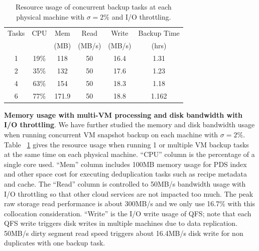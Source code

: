 \begin{table}
\begin{small}
    \begin{tabular}{|c|c|c|c|c|c|}
    \hline
    Tasks & CPU & Mem &Read &  Write  & Backup Time  \\ 
    & & (MB)          &(MB/s) &  (MB/s) & (hrs) \\ \hline
    1     & 19\% & 118 & 50 & 16.4 & 1.31\\ \hline
    2     & 35\% & 132 &50  & 17.6 & 1.23\\ \hline
    4     & 63\% & 154&50   & 18.3 & 1.18\\ \hline
    6     & 77\% & 171.9 & 50 &  18.8 & 1.162\\ \hline
    \end{tabular}
\end{small}
\caption{Resource usage of concurrent backup tasks at each physical machine with $\sigma=2\%$ and I/O throttling.}
\label{tab:resource_usage}
\end{table}

{\bf Memory usage with multi-VM processing and disk bandwidth with  I/O throttling}. 
We have further studied the memory and disk bandwidth usage 
when running concurrent VM snapshot backup on each machine with $\sigma=2\%$. 
Table ~\ref{tab:resource_usage} gives the resource usage  when
running 1 or multiple  VM backup tasks at the same time on each physical machine. 
``CPU'' column is the percentage of a single core used. 
``Mem'' column includes 100MB memory usage for PDS index and other space cost for executing deduplication tasks such as 
recipe metadata and cache. 
The ``Read'' column is controlled to 50MB/s bandwidth usage with I/O throttling so that other cloud services are not impacted too much.
The peak raw storage read performance is about 300MB/s and we only use 16.7\% with this collocation consideration.
``Write'' is the I/O write usage of QFS; note that each QFS write triggers disk writes in multiple machines due to
data replication.     50MB/s dirty segment read speed triggers about 16.4MB/s disk write for non duplicates with one backup task.

